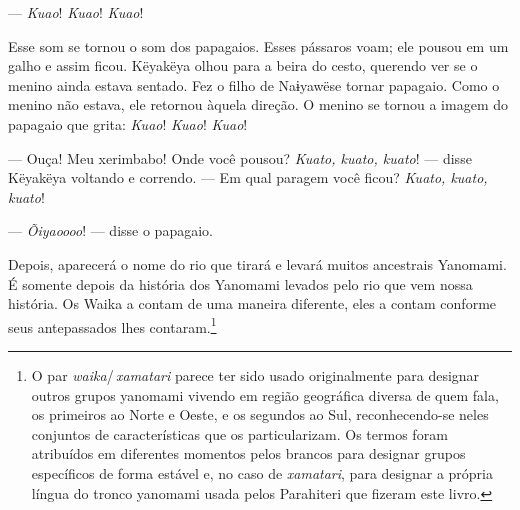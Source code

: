 


--- \textit{Kuao}! \textit{Kuao}! \textit{Kuao}!

Esse som se tornou o som dos papagaios. Esses pássaros voam; ele pousou
em um galho e assim ficou. Këyakëya olhou para a beira do cesto,
querendo ver se o menino ainda estava sentado. Fez o filho de Naɨyawëse
tornar papagaio. Como o menino não estava, ele retornou àquela direção.
O menino se tornou a imagem do papagaio que grita: \textit{Kuao}! \textit{Kuao}!
\textit{Kuao}!

--- Ouça! Meu xerimbabo! Onde você pousou? \textit{Kuato, kuato, kuato}! ---
disse Këyakëya voltando e correndo. --- Em qual paragem você
ficou? \textit{Kuato, kuato, kuato}!

--- \textit{Õiyaoooo}! --- disse o papagaio. 



Depois, aparecerá o nome do rio que tirará e levará muitos ancestrais
Yanomami. É somente depois da história dos Yanomami levados pelo rio que
vem nossa história. Os Waika a contam de uma maneira diferente, eles a
contam conforme seus antepassados lhes contaram.\footnote{O par \textit{waika}/\,\textit{xamatari} parece ter sido usado originalmente para designar outros grupos yanomami vivendo em região geográfica diversa de quem fala, os primeiros ao Norte e Oeste, e os segundos ao Sul, reconhecendo-se neles conjuntos de características que os particularizam. Os termos foram atribuídos em diferentes momentos pelos brancos para designar grupos específicos de forma estável e, no caso de \textit{xamatari}, para designar a própria língua do tronco yanomami usada pelos Parahiteri que fizeram este livro.} 

